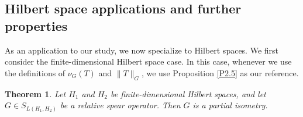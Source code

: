 \documentclass[12pt]{amsart}
\newtheorem{theorem}{Theorem}[section]
\theoremstyle{definition}
\numberwithin{equation}{section}
\begin{document}
	
	\subsection{Hilbert space applications and further properties}
	
	As an application to our study, we now specialize to Hilbert spaces. We first consider the finite-dimensional Hilbert space case. In this case, whenever we use the definitions of $\nu_G(T)$ and $\|T\|_G$, we use Proposition \ref{P2.5} as our reference.
    
	
	\begin{theorem}\label{Th3.11}
		Let $H_{1}$ and $H_{2}$ be finite-dimensional Hilbert spaces, and let $G \in S_{L(H_{1}, H_{2})}$ be a relative spear operator. Then $G$ is a partial isometry.
	\end{theorem}
	
\end{document}
